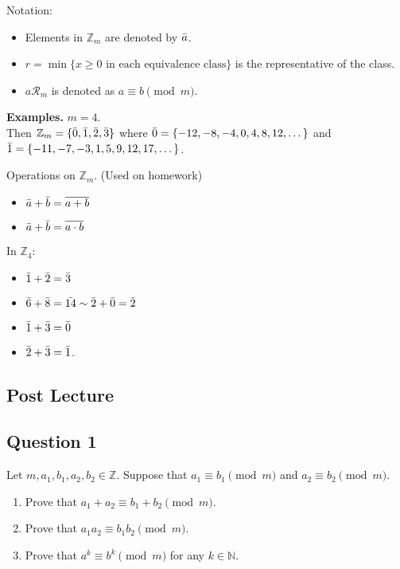 \documentclass{article}
\begin{document}
    \vspace{1.5mm}
    Notation:
    \begin{itemize}
        \item Elements in $\mathbb{Z}_{m}$ are denoted by $\Bar{a}$.
        \item $r = \min \{x \ge 0 \text{ in each equivalence class}\}$ is the representative of the class.
        \item $a \mathcal{R}_{m}$ is denoted as $a \equiv b \pmod{m}$.
    \end{itemize}
    
    \vspace{1.5mm}
    \textbf{Examples. }
    $m = 4$. \\
    Then $\mathbb{Z}_{m} = \{\Bar{0}, \Bar{1}, \Bar{2}, \Bar{3}\}$ where $\Bar{0} = \{-12, -8, -4, 0, 4, 8, 12, \dots\}$ and $\Bar{1} = \{-11, -7, -3, 1, 5, 9, 12, 17, \dots\}$.
    
    Operations on $\mathbb{Z}_{m}$. (Used on homework)
    \begin{itemize}
        \item $\Bar{a} + \Bar{b} = \overline{a + b}$
        \item $\Bar{a} + \Bar{b} = \overline{a \cdot b}$
    \end{itemize}
    In $\mathbb{Z}_{4}$:
    \begin{itemize}
        \item $\Bar{1} + \Bar{2} = \Bar{3}$
        \item $\Bar{6} + \Bar{8} = \Bar{14} \sim \Bar{2} + \Bar{0} = \Bar{2}$
        \item $\Bar{1} + \Bar{3} = \Bar{0}$
        \item $\Bar{2} + \Bar{3} = \Bar{1}$.
    \end{itemize}

\subsection*{Post Lecture}

\subsection*{Question 1}
    Let $m, a_1, b_1, a_2, b_2 \in \mathbb{Z}$. Suppose that $a_1 \equiv b_1 \pmod m$ and $a_2 \equiv b_2 \pmod m$.
    \begin{enumerate}
        \item Prove that $a_1 + a_2 \equiv b_1 + b_2 \pmod m$.
        \item Prove that $a_1a_2 \equiv b_1b_2 \pmod m$.
        \item Prove that $a^{k} \equiv b^{k} \pmod m$ for any $k \in \mathbb{N}$.
    \end{enumerate}
\end{document}
